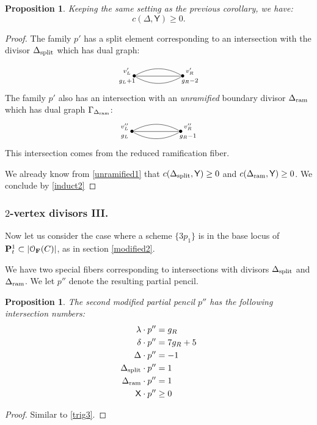 \documentclass[reqno, 10 pt]{article}
\newtheorem{prop}[thm]{Proposition}
\theoremstyle{definition}
\theoremstyle{remark}
\numberwithin{equation}{section}
\numberwithin{thm}{section}
\numberwithin{prop}{section}
\numberwithin{lem}{section}
\numberwithin{cor}{section}
\numberwithin{conj}{section}
\numberwithin{defn}{section}
\newcommand{\F}{{\mathbf F}}
\newcommand{\sfY}{{\mathsf Y}}
\newcommand{\sfX}{{\mathsf X}}
\newcommand{\cO}{{\mathcal O}}
\renewcommand{\P}{{\bf P}}
\renewcommand{\F}{{\bf F}}
\newcommand {\spl}{{\rm split}}
\newcommand {\ram}{{\rm ram}}
\begin{document}
\begin{prop}
Keeping the same setting as the previous corollary, we have: 
$$c(\Delta, \sfY) \geq 0.$$
\end{prop}

\begin{proof}
The family $p'$ has a split element corresponding to an intersection with the divisor $\Delta_{\spl}$ which has dual graph:

\[ \xygraph{
!{<0cm,0cm>;<1cm,0cm>:<0cm,1cm>::}
!{(0,0) }*{\bullet}="l"!{(-.3,.2)}{\scriptstyle v'_L}!{(-.3,-.21)}{\scriptstyle g_L+1}
!{(2,0) }*{\bullet}="r"!{(2.3,.2)}{\scriptstyle v'_R}!{(2.3,-.2)}{\scriptstyle g_R-2}
 "l"-@/^.3cm/"r" 
"l"-"r" 
"l"-@/_.3cm/"r" 
}  \]The family $p'$ also has an intersection with an {\sl unramified} boundary divisor $\Delta_{\ram}$ which has dual graph $\Gamma_{\Delta_{\ram}}$: \[ \xygraph{
!{<0cm,0cm>;<1cm,0cm>:<0cm,1cm>::}
!{(0,0) }*{\bullet}="l"!{(-.3,.2)}{\scriptstyle v''_L}!{(-.3,-.21)}{\scriptstyle g_L}
!{(2,0) }*{\bullet}="r"!{(2.3,.2)}{\scriptstyle v''_R}!{(2.3,-.2)}{\scriptstyle g_R-1}
 "l"-@/^.3cm/"r" 
"l"-"r" 
"l"-@/_.3cm/"r" 
}  \]
This intersection comes from the reduced ramification fiber.




 
 
  We already know from \autoref{unramified1} that $c(\Delta_{\spl}, {\sfY})  \geq 0$ and $c(\Delta_{\ram}, {\sfY}) \geq 0$. We conclude by \autoref{induct2} 

  \end{proof}

\subsubsection{$2$-vertex divisors III.}
Now let us consider the case where a scheme $\{3p_{1}\}$ is in the base locus of $\P^{1}_{t} \subset |\cO_{\F}(C)|$, as in section \ref{modified2}. 

We have two special fibers corresponding to intersections with divisors $\Delta_{\spl}$ and $\Delta_{\ram}$. We let $p''$ denote the resulting partial pencil.

\begin{prop}\label{trig3}
The second modified partial pencil $p''$ has the following intersection numbers: 
\begin{align*}
\lambda \cdot p'' &= g_{R}\\
\delta \cdot p'' &= 7g_{R}+5\\
\Delta \cdot p'' &= -1\\
\Delta_{\spl} \cdot p'' &= 1\\
\Delta_{\ram} \cdot p'' &= 1\\
\sfX \cdot p'' &\geq 0
\end{align*}
\end{prop}
\begin{proof}
Similar to \autoref{trig3}.
\end{proof}
\end{document}
